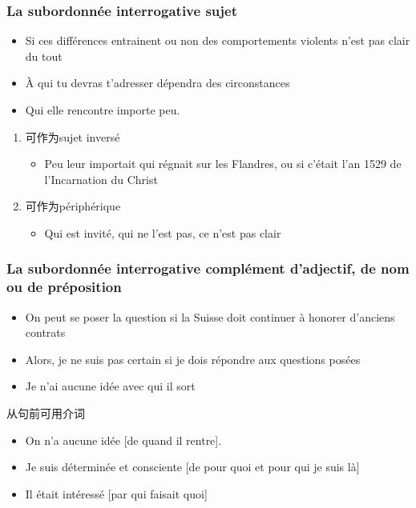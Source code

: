 \documentclass[UTF8]{report}
\begin{document}
\subsubsection{La subordonnée interrogative sujet}
\begin{itemize}
    \item Si ces différences entrainent ou non des comportements violents n’est pas clair du tout
    \item À qui tu devras t’adresser dépendra des circonstances
    \item Qui elle rencontre importe peu.
\end{itemize}
\begin{enumerate}
    \item 可作为sujet inversé
    \begin{itemize}
        \item Peu leur importait qui régnait sur les Flandres, ou si c’était l’an 1529 de l’Incarnation du Christ
    \end{itemize}
    \item 可作为périphérique
    \begin{itemize}
        \item Qui est invité, qui ne l’est pas, ce n’est pas clair
    \end{itemize}
\end{enumerate}

\subsubsection{La subordonnée interrogative complément d’adjectif, de nom ou de préposition}

\begin{itemize}
    \item On peut se poser la question si la Suisse doit continuer à honorer d’anciens contrats
    \item Alors, je ne suis pas certain si je dois répondre aux questions posées
    \item Je n’ai aucune idée avec qui il sort
\end{itemize}
从句前可用介词
\begin{itemize}
    \item On n’a aucune idée [de quand il rentre].
    \item Je suis déterminée et consciente [de pour quoi et pour qui je suis là] 
    \item Il était intéressé [par qui faisait quoi]
\end{itemize}
\end{document}
